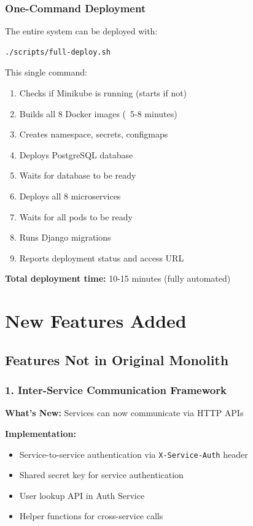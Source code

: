 \documentclass[12pt,a4paper]{article}
\begin{document}
\subsubsection{One-Command Deployment}
The entire system can be deployed with:
\begin{lstlisting}[language=bash,caption={Complete Deployment}]
./scripts/full-deploy.sh
\end{lstlisting}

This single command:
\begin{enumerate}
    \item Checks if Minikube is running (starts if not)
    \item Builds all 8 Docker images (~5-8 minutes)
    \item Creates namespace, secrets, configmaps
    \item Deploys PostgreSQL database
    \item Waits for database to be ready
    \item Deploys all 8 microservices
    \item Waits for all pods to be ready
    \item Runs Django migrations
    \item Reports deployment status and access URL
\end{enumerate}

\textbf{Total deployment time:} 10-15 minutes (fully automated)

\section{New Features Added}

\subsection{Features Not in Original Monolith}

\subsubsection{1. Inter-Service Communication Framework}
\textbf{What's New:} Services can now communicate via HTTP APIs

\textbf{Implementation:}
\begin{itemize}
    \item Service-to-service authentication via \texttt{X-Service-Auth} header
    \item Shared secret key for service authentication
    \item User lookup API in Auth Service
    \item Helper functions for cross-service calls
\end{itemize}
\end{document}
